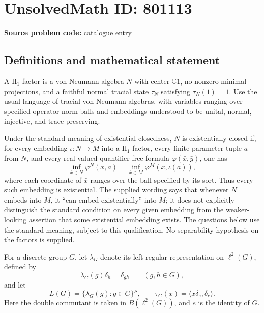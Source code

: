\documentclass[11pt]{article}
\newcommand{\C}{\mathbb{C}}
\begin{document}
\section*{UnsolvedMath ID: 801113}
\textbf{Source problem code:} catalogue entry
\subsection{Definitions and mathematical statement}
A \(\mathrm{II}_1\) factor is a von Neumann algebra \(N\) with center \(\C 1\), no nonzero minimal projections, and a faithful normal tracial state \(\tau_N\) satisfying \(\tau_N(1)=1\). Use the usual language of tracial von Neumann algebras, with variables ranging over specified operator-norm balls and embeddings understood to be unital, normal, injective, and trace preserving.

Under the standard meaning of existential closedness, \(N\) is existentially closed if, for every embedding \(\iota:N\to M\) into a \(\mathrm{II}_1\) factor, every finite parameter tuple \(\bar a\) from \(N\), and every real-valued quantifier-free formula \(\varphi(\bar x,\bar y)\), one has
\[
\inf_{\bar x\in N}\varphi^N(\bar x,\bar a)
=
\inf_{\bar x\in M}\varphi^M(\bar x,\iota(\bar a)),
\]
where each coordinate of \(\bar x\) ranges over the ball specified by its sort. Thus every such embedding is existential. The supplied wording says that whenever \(N\) embeds into \(M\), it ``can embed existentially'' into \(M\); it does not explicitly distinguish the standard condition on every given embedding from the weaker-looking assertion that some existential embedding exists. The questions below use the standard meaning, subject to this qualification. No separability hypothesis on the factors is supplied.

For a discrete group \(G\), let \(\lambda_G\) denote its left regular representation on \(\ell^2(G)\), defined by
\[
\lambda_G(g)\delta_h=\delta_{gh}\qquad(g,h\in G),
\]
and let
\[
L(G)=\{\lambda_G(g):g\in G\}'',\qquad
\tau_G(x)=\langle x\delta_e,\delta_e\rangle.
\]
Here the double commutant is taken in \(B(\ell^2(G))\), and \(e\) is the identity of \(G\).
\end{document}
